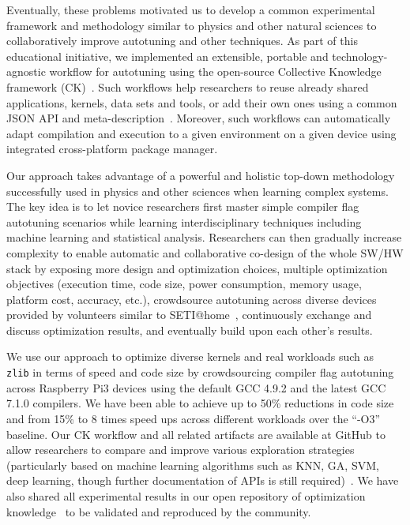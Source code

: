 Eventually, these problems motivated us to develop a common experimental
framework and methodology similar to physics and other natural sciences to
collaboratively improve autotuning and other techniques.
%
As part of this educational initiative, we implemented an extensible, portable
and technology-agnostic workflow for autotuning using the open-source
Collective Knowledge framework (CK)~\cite{ck,ck-date16}.
%
Such workflows help researchers to reuse already shared applications, kernels,
data sets and tools, or add their own ones using a common JSON API and
meta-description~\cite{json-org}. 
%
Moreover, such workflows can automatically
adapt compilation and execution to a given environment on a given device
using integrated cross-platform package manager.

Our approach takes advantage of a powerful and holistic top-down methodology
successfully used in physics and other sciences when learning complex systems.
%
The key idea is to let novice researchers first master simple compiler flag
autotuning scenarios while learning interdisciplinary techniques including
machine learning and statistical analysis.
%
Researchers can then gradually increase complexity to enable automatic and
collaborative co-design of the whole SW/HW stack by exposing more design and
optimization choices, multiple optimization objectives (execution time, code
size, power consumption, memory usage, platform cost, accuracy, etc.),
crowdsource autotuning across diverse devices provided by volunteers similar to
SETI@home~\cite{Anderson:2002:SEP:581571.581573}, 
continuously exchange and discuss optimization results, and
eventually build upon each other's results.

We use our approach to optimize diverse kernels and real workloads such as {\tt
zlib} in terms of speed and code size by crowdsourcing compiler flag autotuning
across Raspberry Pi3 devices using the default GCC 4.9.2 and the latest GCC
7.1.0 compilers.
%
We have been able to achieve up to 50\% reductions in code size and from 15\%
to 8 times speed ups across different workloads over the ``-O3'' baseline.
%
Our CK workflow and all related artifacts are available at GitHub 
to allow researchers to compare and improve various exploration strategies 
(particularly based on machine learning algorithms such as KNN, GA, SVM,
deep learning, though further documentation of APIs is still 
required)~\cite{29db2248aba45e59:a31e374796869125,cm:29db2248aba45e59:cd11e3a188574d80}.
%
We have also shared all experimental results in our open repository of
optimization knowledge~\cite{live-ck-repo,live-ck-repo-rpi-gcc710} to be
validated and reproduced by the community.

